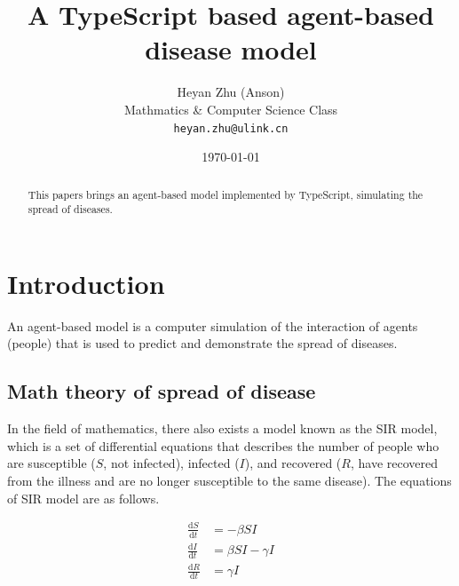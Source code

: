 \documentclass[12pt]{article}
\title{A TypeScript based agent-based disease model}
\author{Heyan Zhu (Anson)\\
\footnotesize Mathmatics \& Computer Science Class\\
\footnotesize \texttt{heyan.zhu@ulink.cn}}
\date{\today}
\begin{document}
\maketitle

\begin{abstract}
This papers brings an agent-based model implemented by TypeScript, simulating the spread of diseases.
\end{abstract}

\newcommand{\md}{\mathrm{d}}

\section{Introduction}
An agent-based model is a computer simulation of the interaction of agents (people) that is used to predict and demonstrate the spread of diseases. \textcite{columbiaGeneral}

\subsection{Math theory of spread of disease}
In the field of mathematics, there also exists a model known as the SIR model, which is a set of differential equations that describes the number of people who are susceptible ($S$, not infected), infected ($I$), and recovered ($R$, have recovered from the illness and are no longer susceptible to the same disease).
The equations of SIR model are as follows.

\begin{align}
    \frac{\md S}{\md t}&=-\beta S I\\
    \frac{\md I}{\md t}&=\beta S I-\gamma I\\
    \frac{\md R}{\md t}&=\gamma I
\end{align}
\end{document}
